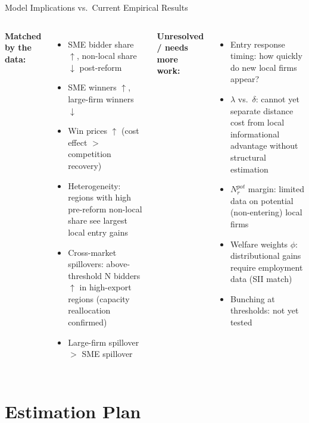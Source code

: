\documentclass[9pt,aspectratio=169]{beamer}
\begin{document}
\begin{frame}{Model Implications vs.\ Current Empirical Results}
\begin{columns}[T]
  \textbf{Matched by the data:}
  \begin{itemize}
    \item[\checkmark] SME bidder share $\uparrow$,
          non-local share $\downarrow$ post-reform
    \item[\checkmark] SME winners $\uparrow$,
          large-firm winners $\downarrow$
    \item[\checkmark] Win prices $\uparrow$ (cost effect $>$ competition recovery)
    \item[\checkmark] Heterogeneity: regions with high pre-reform non-local
          share see largest local entry gains
    \item[\checkmark] Cross-market spillovers: above-threshold N bidders
          $\uparrow$ in high-export regions (capacity reallocation confirmed)
    \item[\checkmark] Large-firm spillover $>$ SME spillover
  \end{itemize}

  \textbf{Unresolved / needs more work:}
  \begin{itemize}
    \item[\textbf{?}] Entry response timing: how quickly do new local
          firms appear?
    \item[\textbf{?}] $\lambda$ vs.\ $\delta$: cannot yet separate
          distance cost from local informational advantage without
          structural estimation
    \item[\textbf{?}] $N_r^{pot}$ margin: limited data on potential
          (non-entering) local firms
    \item[\textbf{?}] Welfare weights $\phi$: distributional gains
          require employment data (SII match)
    \item[\textbf{?}] Bunching at thresholds: not yet tested
  \end{itemize}
\end{columns}
\end{frame}


\section{Estimation Plan}
\end{document}
